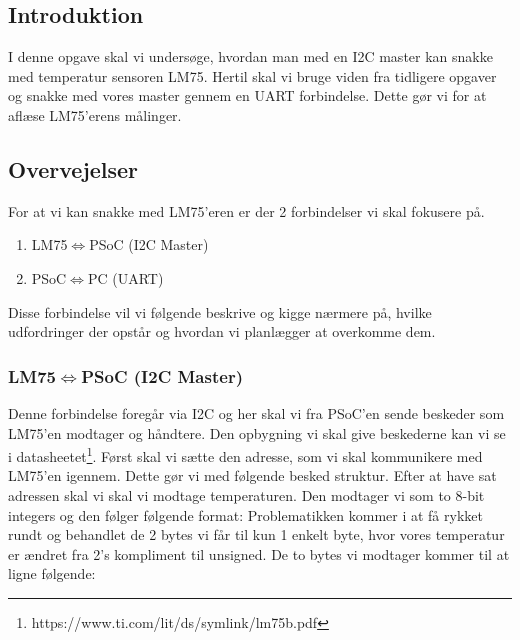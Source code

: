 \documentclass[../main.tex]{subfiles}
\begin{document}
\subsection{Introduktion}
I denne opgave skal vi undersøge, hvordan man med en I2C master kan snakke med temperatur sensoren LM75.
Hertil skal vi bruge viden fra tidligere opgaver og snakke med vores master gennem en UART forbindelse. 
Dette gør vi for at aflæse LM75'erens målinger.

\subsection{Overvejelser}
For at vi kan snakke med LM75'eren er der 2 forbindelser vi skal fokusere på.
\begin{enumerate}
    \item LM75$\iff$PSoC (I2C Master)
    \item PSoC$\iff$PC (UART)
\end{enumerate}
Disse forbindelse vil vi følgende beskrive og kigge nærmere på, hvilke udfordringer der opstår og hvordan vi planlægger at overkomme dem.

\subsubsection{LM75$\iff$PSoC (I2C Master)}
Denne forbindelse foregår via I2C og her skal vi fra PSoC'en sende beskeder som LM75'en modtager og håndtere. Den opbygning vi skal give beskederne kan vi se i datasheetet\footnote{https://www.ti.com/lit/ds/symlink/lm75b.pdf}.
Først skal vi sætte den adresse, som vi skal kommunikere med LM75'en igennem. Dette gør vi med følgende besked struktur.
Efter at have sat adressen skal vi skal vi modtage temperaturen. Den modtager vi som to 8-bit integers og den følger følgende format:
Problematikken kommer i at få rykket rundt og behandlet de 2 bytes vi får til kun 1 enkelt byte, hvor vores temperatur er ændret fra 2's kompliment til unsigned.
De to bytes vi modtager kommer til at ligne følgende:
\end{document}
